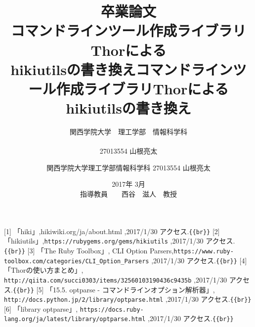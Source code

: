 \documentclass[12pt,a4paper]{jsarticle}
\begin{document}
\title{卒業論文\\
\vspace{4cm} コマンドラインツール作成ライブラリThorによる\\hikiutilsの書き換え}
\author{ 関西学院大学　理工学部　情報科学科\\\\27013554 山根亮太}
\date{\vspace{3cm} 2017年  3月\\
\vspace{3cm} 指導教員　　西谷　滋人　教授}
\maketitle
\tableofcontents

\title{コマンドラインツール作成ライブラリThorによるhikiutilsの書き換え}
\author{関西学院大学理工学部情報科学科 27013554 山根亮太}
\date{}
\maketitle
\tableofcontents



[1] 「hiki」,hikiwiki.org/ja/about.html ,2017/1/30 アクセス.\verb|{{br}}|
[2] 「hikiutils」,\verb|https://rubygems.org/gems/hikiutils| ,2017/1/30 アクセス.\verb|{{br}}|
[3] 「The Ruby Toolbox」, CLI Option Parsers,\verb|https://www.ruby-toolbox.com/categories/CLI_Option_Parsers| ,2017/1/30 アクセス.\verb|{{br}}|
[4] 「Thorの使い方まとめ」, \verb|http://qiita.com/succi0303/items/32560103190436c9435b| ,2017/1/30 アクセス.\verb|{{br}}|
[5] 「15.5. optparse - コマンドラインオプション解析器」, \verb|http://docs.python.jp/2/library/optparse.html| ,2017/1/30 アクセス.\verb|{{br}}|
[6] 「library optparse」, \verb|https://docs.ruby-lang.org/ja/latest/library/optparse.html| ,2017/1/30 アクセス.\verb|{{br}}|
\end{document}
